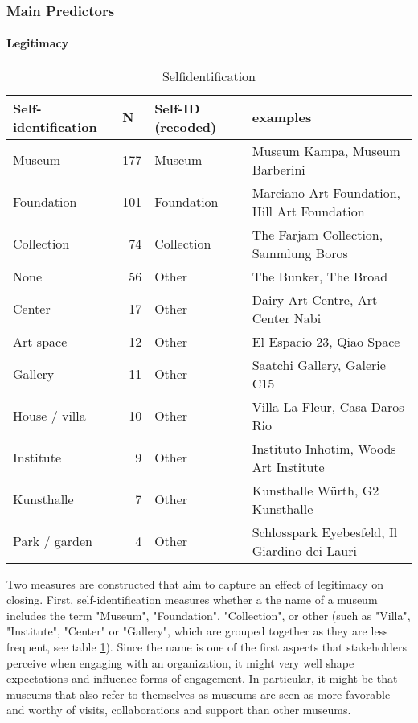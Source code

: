 \documentclass[12pt]{article}
\begin{document}
\subsubsection*{Main Predictors}



\paragraph*{Legitimacy}


\begin{table}[ht]
\centering
\begin{tabular}{lrll}
  \hline 
 \multicolumn{1}{l}{Self-identification} & \multicolumn{1}{l}{N} & \multicolumn{1}{l}{Self-ID (recoded)} & \multicolumn{1}{l}{examples}\\ 
 \hline
 Museum & 177 & Museum & Museum Kampa, Museum Barberini \\ 
  Foundation & 101 & Foundation & Marciano Art Foundation, Hill Art Foundation \\ 
  Collection &  74 & Collection & The Farjam Collection, Sammlung Boros \\ 
  None &  56 & Other & The Bunker, The Broad \\ 
  Center &  17 & Other & Dairy Art Centre, Art Center Nabi \\ 
  Art space &  12 & Other & El Espacio 23, Qiao Space \\ 
  Gallery &  11 & Other & Saatchi Gallery, Galerie C15 \\ 
  House / villa &  10 & Other & Villa La Fleur, Casa Daros Rio \\ 
  Institute &   9 & Other & Instituto Inhotim, Woods Art Institute \\ 
  Kunsthalle &   7 & Other & Kunsthalle Würth, G2 Kunsthalle \\ 
  Park / garden &   4 & Other & Schlosspark Eyebesfeld, Il Giardino dei Lauri \\ 
   \hline
\end{tabular}
\caption{Selfidentification} 
\label{tbl:t_selfid}
\end{table}

Two measures are constructed that aim to capture an effect of legitimacy on closing.
First, self-identification measures whether a the name of a museum includes the term "Museum", "Foundation", "Collection", or other (such as "Villa", "Institute", "Center" or "Gallery", which are grouped together as they are less frequent, see table \ref{tbl:t_selfid}).
Since the name is one of the first aspects that stakeholders perceive when engaging with an organization, it might very well shape expectations and influence forms of engagement.
In particular, it might be that museums that also refer to themselves as museums are seen as more favorable and worthy of visits, collaborations and support than other museums.
\end{document}
